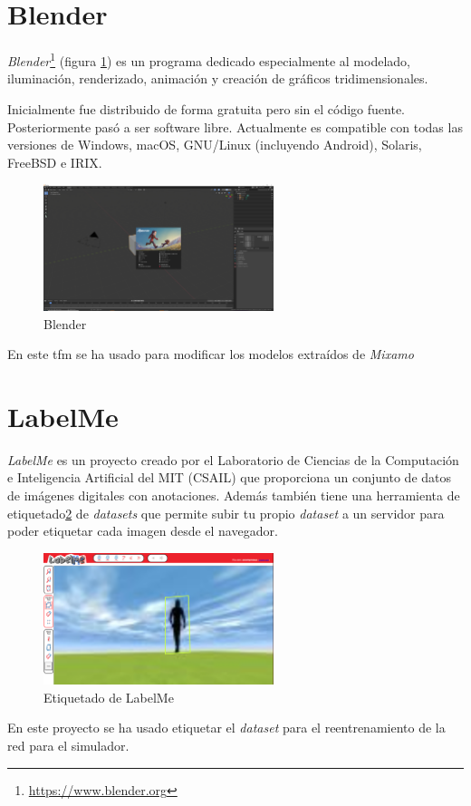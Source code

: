 \section{Blender}
\textit{Blender}\footnote{\url{https://www.blender.org}} (figura \ref{fig:blender}) es un programa dedicado especialmente al modelado, iluminación, renderizado, animación y creación de gráficos tridimensionales.

Inicialmente fue distribuido de forma gratuita pero sin el código fuente. Posteriormente pasó a ser software libre. Actualmente es compatible con todas las versiones de Windows, macOS, GNU/Linux (incluyendo Android), Solaris, FreeBSD e IRIX.
\begin{figure}[H]
  \begin{center}
    \includegraphics[width=0.6\textwidth]{figures/herramientas/blender.png}
		\caption{Blender}
		\label{fig:blender}
		\end{center}
\end{figure}
En este \acrshort{tfm} se ha usado para modificar los modelos extraídos de \textit{Mixamo}
\section{LabelMe}
\textit{LabelMe}\cite{labelme} es un proyecto creado por el Laboratorio de Ciencias de la Computación e Inteligencia Artificial del MIT (CSAIL) que proporciona un conjunto de datos de imágenes digitales con anotaciones. Además también tiene una herramienta de etiquetado\ref{fig:labelme} de \textit{datasets} que permite subir tu propio \textit{dataset} a un servidor para poder etiquetar cada imagen desde el navegador.
\begin{figure}[H]
  \begin{center}
    \includegraphics[width=0.6\textwidth]{figures/herramientas/labelme.png}
		\caption{Etiquetado de LabelMe}
		\label{fig:labelme}
		\end{center}
\end{figure}

En este proyecto se ha usado etiquetar el \textit{dataset} para el reentrenamiento de la red para el simulador.
